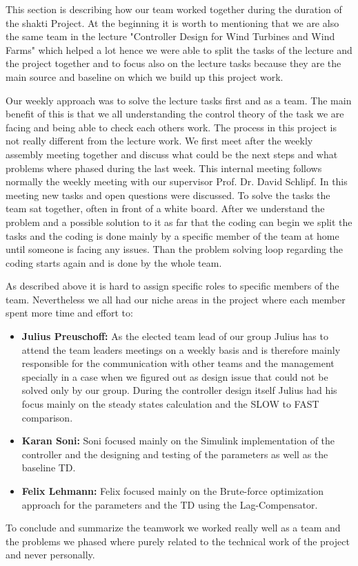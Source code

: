 This section is describing how our team worked together during the duration of the \gls{shakti} Project. At the beginning it is worth to mentioning that we are also the same team in the lecture "Controller Design for Wind	Turbines and Wind Farms" \cite{SchlipfLecture} which helped a lot hence we were able to split the tasks of the lecture and the project together and to focus also on the lecture tasks because they are the main source and baseline on which we build up this project work.

Our weekly approach was to solve the lecture tasks first and as a team. The main benefit of this is that we all understanding the control theory of the task we are facing and being able to check each others work. The process in this project is not really different from the lecture work. We first meet after the weekly assembly meeting together and discuss what could be the next steps and what problems where phased during the last week. This internal meeting follows normally the weekly meeting with our supervisor Prof. Dr. David Schlipf. In this meeting new tasks and open questions were discussed. To solve the tasks the team sat together, often in front of a white board. After we understand the problem and a possible solution to it as far that the coding can begin we split the tasks and the coding is done mainly by a specific member of the team at home until someone is facing any issues. Than the problem solving loop regarding the coding starts again and is done by the whole team. 

As described above it is hard to assign specific roles to specific members of the team. Nevertheless we all had our niche areas in the project where each member spent more time and effort to: 
\begin{itemize}
	\item \textbf{Julius Preuschoff:} As the elected team lead of our group Julius has to attend the team leaders meetings on a weekly basis and is therefore mainly responsible for the communication with other teams and the management specially in a case when we figured out as design issue that could not be solved only by our group. During the controller design itself Julius had his focus mainly on the steady states calculation and the SLOW to FAST comparison.
	
	\item \textbf{Karan Soni:} Soni focused mainly on the Simulink implementation of the controller and the designing and testing of the parameters as well as the baseline TD.
	
	\item \textbf{Felix Lehmann:} Felix focused mainly on the Brute-force optimization approach for the parameters and the TD using the Lag-Compensator.   
\end{itemize} 
 
 To conclude and summarize the teamwork we worked really well as a team and the problems we phased where purely related to the technical work of the project and never personally. 
